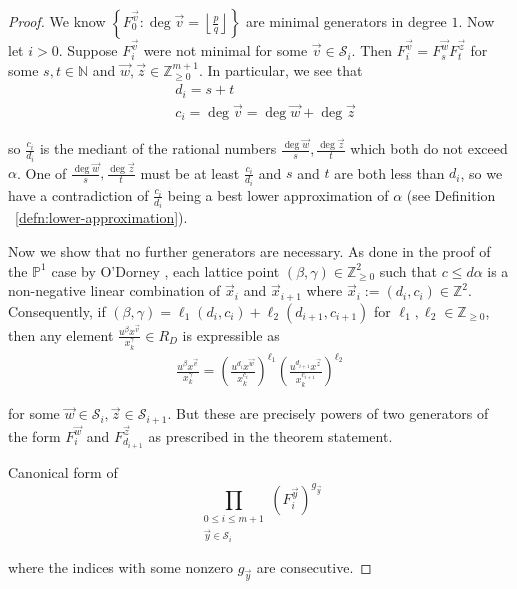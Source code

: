 \documentclass{amsart}
\theoremstyle{plain}
\theoremstyle{definition}
\theoremstyle{remark}
\numberwithin{equation}{section}
\newcommand\bn{{\mathbb N}}
\newcommand\bp{{\mathbb P}}
\newcommand\bz{{\mathbb Z}}
\newcommand\mss{\mathscr{S}}
\begin{document}
\begin{proof}
We know $\left\{F_{0}^{\vec{v}} : \deg \vec{v} = \left\lfloor
\frac{p}{q} \right\rfloor \right\}$ are minimal generators in
degree $1$. Now let $i > 0$. Suppose $F_i^{\vec{v}}$ were not
minimal for some $\vec{v} \in \mss_i$. Then $F_i^{\vec{v}} =
F_{s}^{\vec{w}} F_{t}^{\vec{z}}$ for some $s, t \in \bn$ and
$\vec{w}, \vec{z} \in \bz_{ \geq 0}^{m + 1}$. In particular, we see
that 
\begin{align*}
	&d_i = s + t \\
	&c_i = \deg \vec{v} = \deg \vec{w} + \deg \vec{z}
\end{align*}

\noindent
so $\frac{c_i}{d_i}$ is the mediant of the rational numbers
$\frac{\deg \vec{w}}{s}, \frac{\deg \vec{z}}{t}$ which both
do not exceed $\alpha$. One of $\frac{\deg \vec{w}}{s},
\frac{\deg \vec{z}}{t}$ must be at least $\frac{c_i}{d_i}$
and $s$ and $t$ are both less than $d_i$, so we have a contradiction 
of $\frac{c_i}{d_i}$ being a best lower approximation of $\alpha$
(see Definition ~\ref{defn:lower-approximation}).

Now we show that no further generators are necessary. As done in
the proof of the $\bp^1$ case by O'Dorney \cite[Theorem 6]
{dorney:canonical}, each lattice point $(\beta, \gamma) \in
\bz_{\geq 0}^2$ such that $c \leq d \alpha$ is a non-negative
linear combination of $\vec{x}_i$ and $\vec{x}_{i + 1}$ where
$\vec{x}_i := (d_i, c_i) \in \bz^2$. Consequently, if $(\beta,
\gamma) = \ell_1 (d_i, c_i) + \ell_2 (d_{i + 1}, c_{i + 1})$ for
$\ell_1, \ell_2 \in \bz_{ \geq 0}$, then any element $\frac{u^{\beta}
x^{\vec{v}}} {x_k^{ \gamma}} \in R_D$ is expressible as
\begin{align*}
	\frac{u^{\beta} x^{\vec{v}}} {x_k^{\gamma}} = \left(\frac{u^{d_i}
	x^{\vec{w}}} {x_k^{c_i}}\right)^{\ell_1} \left(\frac{u^{d_{i + 1}}
	x^{\vec{z}}} {x_k^{c_{i + 1}}}\right)^{\ell_2}
\end{align*}

\noindent
for some $\vec{w} \in \mss_i, \vec{z} \in \mss_{i + 1}$. But these
are precisely powers of two generators of the form $F_i^{\vec{w}}$
and $F_{d_{i + 1}}^{\vec{z}}$ as prescribed in the theorem statement.

Canonical form of 
\[
	\prod_{\substack{0 \leq i \leq m + 1 \\ \vec{y}
	\in \mss_i}} (F_i^{\vec{y}})^{g_{\vec{y}}}
\]

\noindent
where the indices with
some nonzero $g_{\vec{y}}$ are consecutive.
\end{proof}
\end{document}
